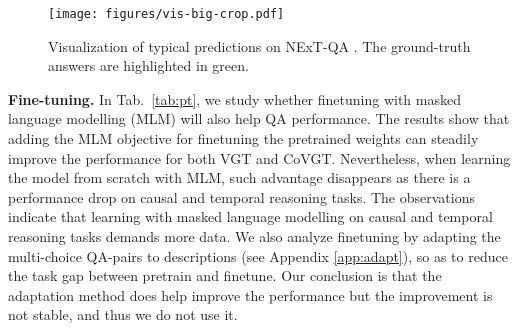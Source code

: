 \documentclass[10pt,journal,compsoc]{IEEEtran}
\begin{document}
\setlength{\tabcolsep}{5pt}
\begin{table}[t!]
    \small
    \centering
    \caption{Study of finetuning the pretrained (PT) weights.}
    \label{tab:pt}
    \vspace{-0.5em}
    \vspace{-0.4cm}
\end{table}

\begin{figure*}[t!]
  \begin{center}
    \texttt{[image: figures/vis-big-crop.pdf]}
  \end{center}
  \vspace{-0.2cm}
  \caption{Visualization of typical predictions on NExT-QA \cite{xiao2021next}. The ground-truth answers are highlighted in green. }
  \label{fig:vis}
  \vspace{-0.4cm}
\end{figure*}
\textbf{Fine-tuning.}
\label{sec:ft}
In Tab.~\ref{tab:pt}, we study whether finetuning with masked language modelling (MLM) will also help QA performance. The results show that adding the MLM objective for finetuning the pretrained weights can steadily improve the performance for both VGT and CoVGT. Nevertheless, when learning the model from scratch with MLM, such advantage disappears as there is a performance drop on causal and temporal reasoning tasks. The observations indicate that learning with masked language modelling on causal and temporal reasoning tasks demands more data. We also analyze finetuning by adapting the multi-choice QA-pairs to descriptions (see Appendix \ref{app:adapt}), so as to reduce the task gap between pretrain and finetune. Our conclusion is that the adaptation method does help improve the performance but the improvement is not stable, and thus we do not use it.
\end{document}
